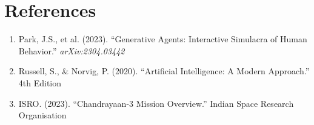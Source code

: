 \documentclass[12pt,a4paper]{article}
\begin{document}
\section*{References}
\small
\begin{enumerate}[leftmargin=*]
    \item Park, J.S., et al. (2023). ``Generative Agents: Interactive Simulacra of Human Behavior.'' \textit{arXiv:2304.03442}
    \item Russell, S., \& Norvig, P. (2020). ``Artificial Intelligence: A Modern Approach.'' 4th Edition
    \item ISRO. (2023). ``Chandrayaan-3 Mission Overview.'' Indian Space Research Organisation
\end{enumerate}

\vfill
\begin{center}
\end{center}
\end{document}
